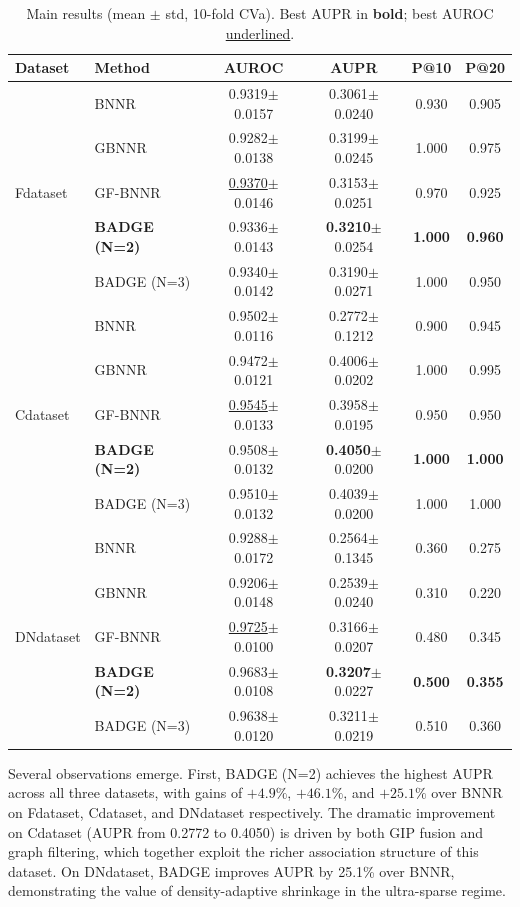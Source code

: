 \documentclass{oup-authoring-template}
\begin{document}
\begin{table}[htbp]
\centering
\caption{Main results (mean $\pm$ std, 10-fold CVa). Best AUPR in \textbf{bold}; best AUROC \underline{underlined}.}
\label{tab:main_results}
\small
\begin{tabular}{llcccc}
\toprule
Dataset & Method & AUROC & AUPR & P@10 & P@20 \\
\midrule
\multirow{5}{*}{Fdataset}
& BNNR & 0.9319$\pm$0.0157 & 0.3061$\pm$0.0240 & 0.930 & 0.905 \\
& GBNNR & 0.9282$\pm$0.0138 & 0.3199$\pm$0.0245 & 1.000 & 0.975 \\
& GF-BNNR & \underline{0.9370}$\pm$0.0146 & 0.3153$\pm$0.0251 & 0.970 & 0.925 \\
& \textbf{BADGE (N=2)} & 0.9336$\pm$0.0143 & \textbf{0.3210}$\pm$0.0254 & \textbf{1.000} & \textbf{0.960} \\
& BADGE (N=3) & 0.9340$\pm$0.0142 & 0.3190$\pm$0.0271 & 1.000 & 0.950 \\
\midrule
\multirow{5}{*}{Cdataset}
& BNNR & 0.9502$\pm$0.0116 & 0.2772$\pm$0.1212 & 0.900 & 0.945 \\
& GBNNR & 0.9472$\pm$0.0121 & 0.4006$\pm$0.0202 & 1.000 & 0.995 \\
& GF-BNNR & \underline{0.9545}$\pm$0.0133 & 0.3958$\pm$0.0195 & 0.950 & 0.950 \\
& \textbf{BADGE (N=2)} & 0.9508$\pm$0.0132 & \textbf{0.4050}$\pm$0.0200 & \textbf{1.000} & \textbf{1.000} \\
& BADGE (N=3) & 0.9510$\pm$0.0132 & 0.4039$\pm$0.0200 & 1.000 & 1.000 \\
\midrule
\multirow{5}{*}{DNdataset}
& BNNR & 0.9288$\pm$0.0172 & 0.2564$\pm$0.1345 & 0.360 & 0.275 \\
& GBNNR & 0.9206$\pm$0.0148 & 0.2539$\pm$0.0240 & 0.310 & 0.220 \\
& GF-BNNR & \underline{0.9725}$\pm$0.0100 & 0.3166$\pm$0.0207 & 0.480 & 0.345 \\
& \textbf{BADGE (N=2)} & 0.9683$\pm$0.0108 & \textbf{0.3207}$\pm$0.0227 & \textbf{0.500} & \textbf{0.355} \\
& BADGE (N=3) & 0.9638$\pm$0.0120 & 0.3211$\pm$0.0219 & 0.510 & 0.360 \\
\bottomrule
\end{tabular}
\end{table}

Several observations emerge. First, BADGE (N=2) achieves the highest AUPR across all three datasets, with gains of $+4.9\%$, $+46.1\%$, and $+25.1\%$ over BNNR on Fdataset, Cdataset, and DNdataset respectively. The dramatic improvement on Cdataset (AUPR from 0.2772 to 0.4050) is driven by both GIP fusion and graph filtering, which together exploit the richer association structure of this dataset. On DNdataset, BADGE improves AUPR by 25.1\% over BNNR, demonstrating the value of density-adaptive shrinkage in the ultra-sparse regime.
\end{document}
